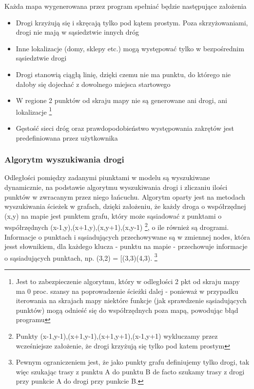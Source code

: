 \documentclass{article}
\begin{document}
Każda mapa wygenerowana przez program spełniać będzie następujące założenia

	\begin{itemize}
		\item Drogi krzyżują się i skręcają tylko pod kątem prostym. Poza skrzyżowaniami, drogi nie mają w sąsiedztwie innych dróg
		\item Inne lokalizacje (domy, sklepy etc.) mogą występować tylko w bezpośrednim sąsiedztwie drogi
		\item Drogi stanowią ciągłą linię, dzięki czemu nie ma punktu, do którego nie dałoby się dojechać z dowolnego miejsca startowego
		\item W regione 2 punktów od skraju mapy nie są generowane ani drogi, ani lokalizacje  \footnote{Jest to zabezpieczenie algorytmu, który w odległości 2 pkt od skraju mapy ma 0 proc. szansy na poprowadzenie ścieżki dalej - ponieważ w przypadku iterowania na skrajach mapy niektóre funkcje (jak sprawdzenie sąsiadujących punktów) mogą odnieść się do współrzędnych poza mapą, powodując błąd programu}
	 	\item Gęstość sieci dróg oraz prawdopodobieństwo występowania zakrętów jest predefiniowana przez użytkownika
	\end{itemize}

\subsubsection{Algorytm wyszukiwania drogi} 

Odległości pomiędzy zadanymi piunktami w modelu są wyszukiwane dynamicznie, na podstawie algorytmu wyszukiwania drogi i zliczaniu ilości punktów w zwracanym przez niego łańcuchu. Algorytm oparty jest na metodach wyszukiwania ścieżek w grafach, dzięki założeniu, że każdy droga o współrzędnej (x,y) na mapie jest punktem grafu, który może sąsiadować z punktami o współrzędnych (x-1,y),(x+1,y),(x,y+1),(x,y-1) \footnote{Punkty (x-1,y-1),(x+1,y-1),(x+1,y+1),(x-1,y+1) wykluczamy przez wcześniejsze założenie, że drogi krzyżują się tylko pod katem prostym}, o ile również są drogrami. Informacje o punktach i sąsiadujących przechowywane są w zmiennej nodes, która jesst słownikiem, dla każdego klucza - punktu na mapie - przechowuje informacje o sąsiadujących punktach, np. (3,2) = [(3,3)(4,3). \footnote{Pewnym ograniczeniem jest, że jako punkty grafu definiujemy tylko drogi, tak więc szukając trasy z punktu A do punktu B de facto szukamy trasy z drogi przy punkcie A do drogi przy punkcie B.}
\end{document}
